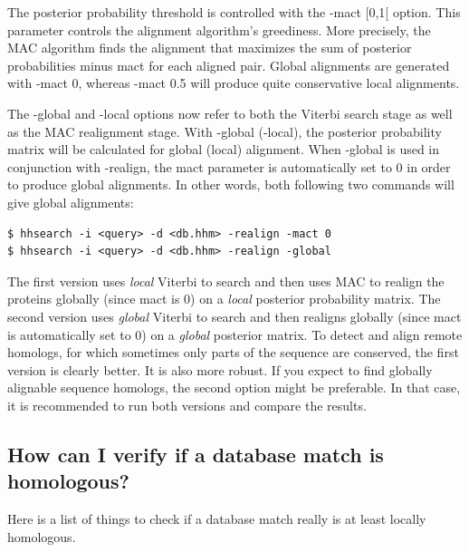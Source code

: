 \documentclass[11pt,a4paper]{article}
\begin{document}
The posterior probability threshold is controlled with the -mact [0,1[ option. 
This parameter controls the alignment algorithm's greediness. More precisely, the 
MAC algorithm finds the alignment that maximizes the sum of posterior probabilities 
minus mact for each aligned pair. Global alignments are generated with -mact 0, 
whereas -mact 0.5 will produce quite conservative local alignments. 

The -global and -local options now refer to both the Viterbi search stage as 
well as the MAC realignment stage. With -global (-local), the posterior probability 
matrix will be calculated for global (local) alignment. When -global is used in 
conjunction with -realign, the mact parameter is automatically set to 0 in order to 
produce global alignments. In other words, both following two commands will give 
global alignments:
\begin{verbatim}
$ hhsearch -i <query> -d <db.hhm> -realign -mact 0
$ hhsearch -i <query> -d <db.hhm> -realign -global
\end{verbatim}

The first version uses \emph{local} Viterbi to search and then uses MAC to realign the 
proteins globally (since mact is 0) on a \emph{local} posterior probability matrix. The 
second version uses \emph{global} Viterbi to search and then realigns globally (since mact 
is automatically set to 0) on a \emph{global} posterior matrix. To detect and align remote 
homologs, for which sometimes only parts of the sequence are conserved, the first 
version is clearly better. It is also more robust. If you expect to find globally 
alignable sequence homologs, the second option might be preferable. In that case, 
it is recommended to run both versions and compare the results. 

\subsection{How can I verify if a database match is homologous?}

Here is a list of things to check if a database match really is at least locally homologous.
 
\end{document}

